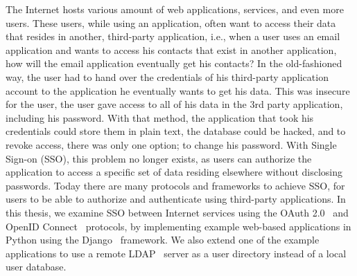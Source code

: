 
The Internet hosts various amount of web applications, services, and even more users.
These users, while using an application, often want to access their data that resides in another, third-party application, i.e., when a user uses an email application and wants to access his contacts that exist in another application, how will the email application eventually get his contacts?
In the old-fashioned way, the user had to hand over the credentials of his third-party application account to the application he eventually wants to get his data.
This was insecure for the user, the user gave access to all of his data in the 3rd party application, including his password.
With that method, the application that took his credentials could store them in plain text, the database could be hacked, and to revoke access, there was only one option; to change his password. With Single Sign-on (SSO), this problem no longer exists, as users can authorize the application to access a specific set of data residing elsewhere without disclosing passwords.
Today there are many protocols and frameworks to achieve SSO, for users to be able to authorize and authenticate using third-party applications.
In this thesis, we examine SSO between Internet services using the OAuth 2.0~\cite{OAUTH} and OpenID Connect~\cite{OIDC}  protocols, by implementing example web-based applications in Python using the Django~\cite{Django} framework. We also extend one of the example applications to use a remote LDAP~\cite{LDAP} server as a user directory instead of a local user database.
